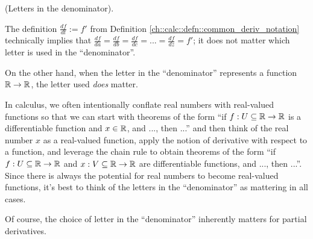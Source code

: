 \begin{remark}
    (Letters in the denominator).
    
    The definition $\frac{df}{dt} := f'$ from Definition \ref{ch::calc::defn::common_deriv_notation} technically implies that $\frac{df}{da} = \frac{df}{db} = \frac{df}{dc} = ... = \frac{df}{dz} = f'$; it does not matter which letter is used in the ``denominator''.
    
    On the other hand, when the letter in the ``denominator'' represents a function $\mathbb{R} \rightarrow \mathbb{R}$, the letter used \textit{does} matter.
    
    In calculus, we often intentionally conflate real numbers with real-valued functions so that we can start with theorems of the form ``if $f:U \subseteq \mathbb{R} \rightarrow \mathbb{R}$ is a differentiable function and $x \in \mathbb{R}$, and ..., then ...'' and then think of the real number $x$ as a real-valued function, apply the notion of derivative with respect to a function, and leverage the chain rule to obtain theorems of the form ``if $f: U \subseteq \mathbb{R} \rightarrow \mathbb{R}$ and $x:V \subseteq \mathbb{R} \rightarrow \mathbb{R}$ are differentiable functions, and ..., then ...''. Since there is always the potential for real numbers to become real-valued functions, it's best to think of the letters in the ``denominator'' as mattering in all cases. 
    
    Of course, the choice of letter in the ``denominator'' inherently matters for partial derivatives.
\end{remark}

\begin{comment}
\begin{defn}
    (Antiderivative). 
    
    Let $f:I \rightarrow \R$ be a function defined on an interval $I$. An \textit{antiderivative of $f$ (on $I$)} is a function $F:I \rightarrow \R$ whose derivative is $f$, i.e., $F' = f$.
    
    We denote a particular antiderivative of $f$ by $\int f$. If $f$ has an antiderivative $\int f$, then all other antiderivatives of $f$ are of the form $\int f + c$, where $c \in \R$ is a constant.
    
    Note, we have not shown yet that any function actually has an antiderivative. A corollary of the first part of the fundamental theorem of calculus is that every continuous function has an antiderivative.
\end{defn}

\begin{defn}
    (Difference notation). If $f:A \rightarrow \R \rightarrow \R$ is function defined on any nonempty set $A \subseteq \R$, then we define, for $a, b \in A$, the notation $f|^b_a := f(b) - f(a)$.
\end{defn}
\end{comment}

